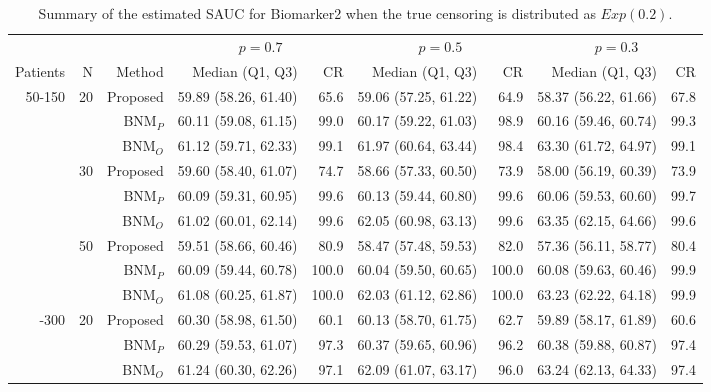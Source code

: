 \begin{table}[!htb]

\caption{\label{tab:sauc2}Summary of the estimated SAUC for Biomarker2 when the true censoring is distributed as $Exp(0.2)$.}
\centering
\begin{threeparttable}
\begin{tabular}[t]{rrrrrrrrr}
\toprule
\multicolumn{1}{c}{} & \multicolumn{1}{c}{} & \multicolumn{1}{c}{} & \multicolumn{2}{c}{$p = 0.7$} & \multicolumn{2}{c}{$p = 0.5$} & \multicolumn{2}{c}{$p = 0.3$} \\
\cmidrule(l{3pt}r{3pt}){4-5} \cmidrule(l{3pt}r{3pt}){6-7} \cmidrule(l{3pt}r{3pt}){8-9}
Patients & N & Method & Median (Q1, Q3) & CR & Median (Q1, Q3) & CR & Median (Q1, Q3) & CR\\
\midrule
50-150 & 20 & Proposed & 59.89 (58.26, 61.40) & 65.6 & 59.06 (57.25, 61.22) & 64.9 & 58.37 (56.22, 61.66) & 67.8\\
 &  & BNM$_P$ & 60.11 (59.08, 61.15) & 99.0 & 60.17 (59.22, 61.03) & 98.9 & 60.16 (59.46, 60.74) & 99.3\\
 &  & BNM$_O$ & 61.12 (59.71, 62.33) & 99.1 & 61.97 (60.64, 63.44) & 98.4 & 63.30 (61.72, 64.97) & 99.1\\
\addlinespace
 & 30 & Proposed & 59.60 (58.40, 61.07) & 74.7 & 58.66 (57.33, 60.50) & 73.9 & 58.00 (56.19, 60.39) & 73.9\\
 &  & BNM$_P$ & 60.09 (59.31, 60.95) & 99.6 & 60.13 (59.44, 60.80) & 99.6 & 60.06 (59.53, 60.60) & 99.7\\
 &  & BNM$_O$ & 61.02 (60.01, 62.14) & 99.6 & 62.05 (60.98, 63.13) & 99.6 & 63.35 (62.15, 64.66) & 99.6\\
\addlinespace
 & 50 & Proposed & 59.51 (58.66, 60.46) & 80.9 & 58.47 (57.48, 59.53) & 82.0 & 57.36 (56.11, 58.77) & 80.4\\
 &  & BNM$_P$ & 60.09 (59.44, 60.78) & 100.0 & 60.04 (59.50, 60.65) & 100.0 & 60.08 (59.63, 60.46) & 99.9\\
 &  & BNM$_O$ & 61.08 (60.25, 61.87) & 100.0 & 62.03 (61.12, 62.86) & 100.0 & 63.23 (62.22, 64.18) & 99.9\\
\addlinespace
50-300 & 20 & Proposed & 60.30 (58.98, 61.50) & 60.1 & 60.13 (58.70, 61.75) & 62.7 & 59.89 (58.17, 61.89) & 60.6\\
 &  & BNM$_P$ & 60.29 (59.53, 61.07) & 97.3 & 60.37 (59.65, 60.96) & 96.2 & 60.38 (59.88, 60.87) & 97.4\\
 &  & BNM$_O$ & 61.24 (60.30, 62.26) & 97.1 & 62.09 (61.07, 63.17) & 96.0 & 63.24 (62.13, 64.33) & 97.4\\

\end{tabular}
\end{threeparttable}
\end{table}
